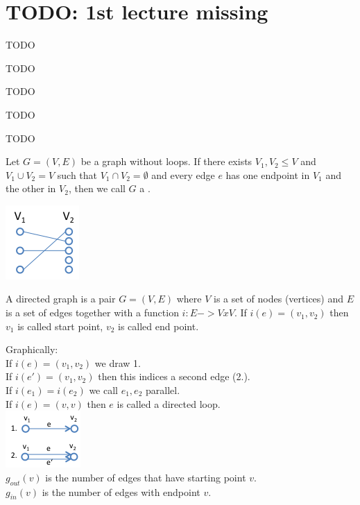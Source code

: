 \chapter{TODO: 1st lecture missing}

\begin{descr}
    TODO
\end{descr}


\begin{definition}
    TODO
\end{definition}
\begin{definition}
    TODO
\end{definition}
\begin{definition}
    TODO
\end{definition}
\begin{lemma}
    TODO
\end{lemma}

\begin{definition}
    Let $G = (V,E)$ be a graph without loops. If there exists $V_{1}, V_{2} \leq V$ and $V_{1} \cup V_{2} = V$
    such that $V_{1} \cap V_{2} = \emptyset$ and every edge $e$ has one endpoint in $V{_1}$ and the other in $V_{2}$,
    then we call $G$ a .
\end{definition}

\begin{example*}
    \includegraphics{diagrams/def14_example1.png}
\end{example*}

\begin{definition}
    A directed graph is a pair $G = (V,E)$ where $V$ is a set of nodes (vertices) and $E$ is a set of edges together 
    with a function $i: E -> V x V$. If $i(e) = (v_{1},v_{2})$ then $v_{1}$ is called start point, $v_{2}$ is called end point.
\end{definition}
Graphically: \\[3mm]
If $i(e) = (v_{1},v_{2})$ we draw 1. \\
If $i(e') = (v_{1},v_{2})$ then this indices a second edge (2.). \\
If $i(e_{1}) = i(e_{2})$ we call $e_{1},e_{2}$ parallel. \\
If $i(e) = (v,v)$ then $e$ is called a directed loop. \\
\includegraphics{diagrams/def15_directd_graph.png} \\
$g_{out}(v)$ is the number of edges that have starting point $v$. \\
$g_{in}(v)$ is the number of edges with endpoint $v$.

